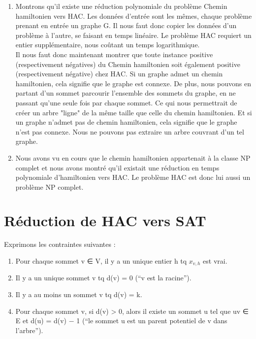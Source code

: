 \documentclass[a4paper]{article}
\begin{document}
\begin{enumerate}

\item %

Montrons qu'il existe une réduction polynomiale du problème Chemin hamiltonien
vers HAC. Les données d'entrée sont les mêmes, chaque problème prenant en entrée
un graphe G. Il nous faut donc copier les données d'un problème à l'autre, se
faisant en temps linéaire. Le problème HAC requiert un entier supplémentaire,
nous coûtant un temps logarithmique.\\
Il nous faut donc maintenant montrer que toute instance positive (respectivement négatives)
 du Chemin hamiltonien soit également positive (respectivement négative) chez HAC.
Si un graphe admet un chemin hamiltonien, cela signifie que le graphe est connexe.
De plus, nous pouvons en partant d'un sommet parcourir l'ensemble des sommets du
graphe, en ne passant qu'une seule fois par chaque sommet. Ce qui nous permettrait
de créer un arbre "ligne" de la même taille que celle du chemin hamiltonien. Et
si un graphe n'admet pas de chemin hamiltonien, cela signifie que le graphe n'est
pas connexe. Nous ne pouvons pas extraire un arbre couvrant d'un tel graphe.

\item %

Nous avons vu en cours que le chemin hamiltonien appartenait à la classe NP complet
et nous avons montré qu'il existait une réduction en temps polynomiale d'hamiltonien
vers HAC. Le problème HAC est donc lui aussi un problème NP complet.

\end{enumerate}

\newpage
\section{Réduction de HAC vers SAT}

Exprimons les contraintes suivantes :\\
\begin{enumerate}

\item Pour chaque sommet v ∈ V, il y a un unique entier h tq $x_{v,h}$ est vrai.
\item Il y a un unique sommet v tq d(v) = 0 (“v est la racine”).
\item Il y a au moins un sommet v tq d(v) = k.
\item Pour chaque sommet v, si d(v) > 0, alors il existe un sommet u tel que uv ∈ E et d(u) = d(v) − 1 (“le sommet u est un parent potentiel de v dans l’arbre”).
\end{enumerate}
\vspace{0.5cm}
\end{document}
